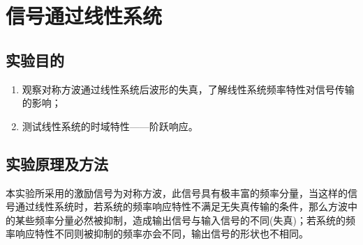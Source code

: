 \chapter{信号通过线性系统}%
\label{cha:信号通过线性系统}

\section{实验目的}%
\label{sec:实验目的\arabic{chapter}}

\begin{enumerate}
	\item 观察对称方波通过线性系统后波形的失真，了解线性系统频率特性对信号传输的影响；
	\item 测试线性系统的时域特性——阶跃响应。
\end{enumerate}

\section{实验原理及方法}%
\label{sec:实验原理及方法\arabic{chapter}}

本实验所采用的激励信号为对称方波，此信号具有极丰富的频率分量，当这样的信号通过线性系统时，若系统的频率响应特性不满足无失真传输的条件，那么方波中的某些频率分量必然被抑制，造成输出信号与输入信号的不同(失真)；若系统的频率响应特性不同则被抑制的频率亦会不同，输出信号的形状也不相同。

